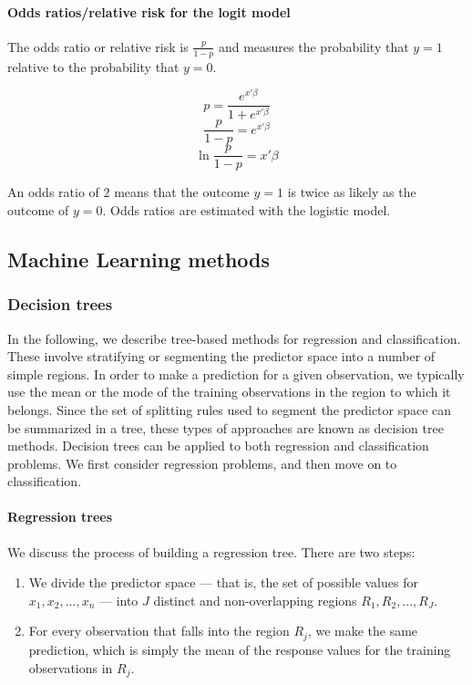 \paragraph{Odds ratios/relative risk for the logit model}
The odds ratio or relative risk is $\frac{p}{1-p}$ and measures the probability that $y=1$ relative
to the probability that $y=0$.

$$p = \frac{e^{x'\beta}}{1+e^{x'\beta}}$$
$$\frac{p}{1-p} = e^{x'\beta}$$
$$\ln \frac{p}{1-p} = x'\beta$$

An odds ratio of $2$ means that the outcome $y=1$ is twice as likely as the outcome of $y=0$. Odds
ratios are estimated with the logistic model.


\subsection{Machine Learning methods}
\subsubsection{Decision trees}

In the following, we describe tree-based methods for regression and classification. These involve
stratifying or segmenting the predictor space into a number of simple regions. In order to make a
prediction for a given observation, we typically use the mean or the mode of the training
observations in the region to which it belongs. Since the set of splitting rules used to segment the
predictor space can be summarized in a tree, these types of approaches are known as decision tree
methods. Decision trees can be applied to both regression and classification problems. We first
consider regression problems, and then move on to classification.

\paragraph{Regression trees}
We discuss the process of building a regression tree. There are two steps:
\begin{enumerate}
    \item We divide the predictor space --- that is, the set of possible values for $x_1, x_2, ...,
x_n$ --- into $J$ distinct and non-overlapping regions $R_1, R_2, ..., R_J$.
    \item For every observation that falls into the region $R_j$, we make the same prediction, which
is simply the mean of the response values for the training observations in $R_j$.
\end{enumerate}


